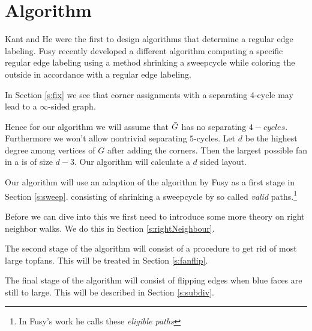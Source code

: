
\section{Algorithm}

\label{s:algo}
Kant and He \cite{Kant1997} were the first to design algorithms that determine a regular edge labeling. Fusy \cite{Fusy2006} recently developed a different algorithm computing a specific regular edge labeling using a method shrinking a sweepcycle while coloring the outside in accordance with a regular edge labeling.

In Section \ref{s:fix} we see that corner assignments with a separating $4$-cycle may lead to a $\infty$-sided graph.


Hence for our algorithm we will assume that $\bar{G}$ has no separating $4-cycles$. Furthermore we won't allow nontrivial separating $5$-cycles. Let $d$ be the highest degree among vertices of $G$ after adding the corners. Then the largest possible fan in a \rel is of size $d-3$. Our algorithm will calculate a $d$ sided layout.



Our algorithm will use an adaption of the algorithm by Fusy as a first stage in Section \ref{s:sweep}.  consisting of shrinking a sweepcycle by so called \emph{valid} paths.\footnote{In Fusy's work he calls these \emph{eligible paths}}

Before we can dive into this we first need to introduce some more theory on right neighbor walks. We do this in Section \ref{s:rightNeighbour}.

The second stage of the algorithm will consist of a procedure to get rid of most large topfans. This will be treated in Section \ref{s:fanflip}.

The final stage of the algorithm will consist of flipping edges when blue faces are still to large. This will be described in Section \ref{s:subdiv}.
